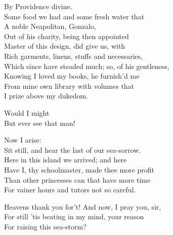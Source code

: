 	
\begin{verse_speech}[Prospero] 
By Providence divine.\\
Some food we had and some fresh water that\\
A noble Neapolitan, Gonzalo,\\
Out of his charity, being then appointed\\
Master of this design, did give us, with\\
Rich garments, linens, stuffs and necessaries,\\
Which since have steaded much; so, of his gentleness,\\
Knowing I loved my books, he furnish'd me\\
From mine own library with volumes that\\
I prize above my dukedom.
\end{verse_speech}

\begin{verse_speech}[Miranda] 
Would I might\\
But ever see that man!
\end{verse_speech}

\begin{verse_speech}[Prospero] 
Now I arise:\\
Sit still, and hear the last of our sea-sorrow.\\
Here in this island we arrived; and here\\
Have I, thy schoolmaster, made thee more profit\\
Than other princesses can that have more time\\
For vainer hours and tutors not so careful.
\end{verse_speech}

\begin{verse_speech}[Miranda] 
Heavens thank you for't! And now, I pray you, sir,\\
For still 'tis beating in my mind, your reason\\
For raising this sea-storm?
\end{verse_speech}

